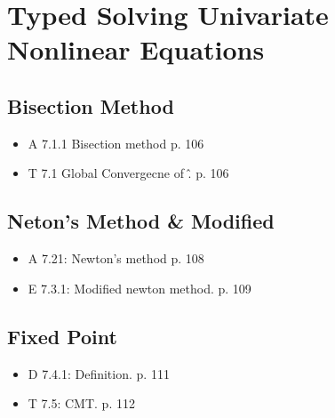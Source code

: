 \documentclass[11pt]{article}
\begin{document}
\section{Typed Solving Univariate Nonlinear Equations}
\label{sub:typed solving univariate nonlinear equations}

\subsection{Bisection Method}
\label{sub:bisection_method}
  \begin{itemize}
    \item A 7.1.1 Bisection method p. 106
    \item T 7.1 Global Convergecne of \^. p. 106
  \end{itemize}
\subsection{Neton's Method \& Modified}
\label{sub:neton_s_method}
  \begin{itemize}
    \item A 7.21: Newton's  method p. 108
    \item E 7.3.1: Modified newton method. p. 109
  \end{itemize}
\subsection{Fixed Point}
\label{sub:fixed_point}
  \begin{itemize}
    \item D 7.4.1: Definition. p. 111
    \item T 7.5: CMT. p. 112
  \end{itemize}
  
\end{document}
